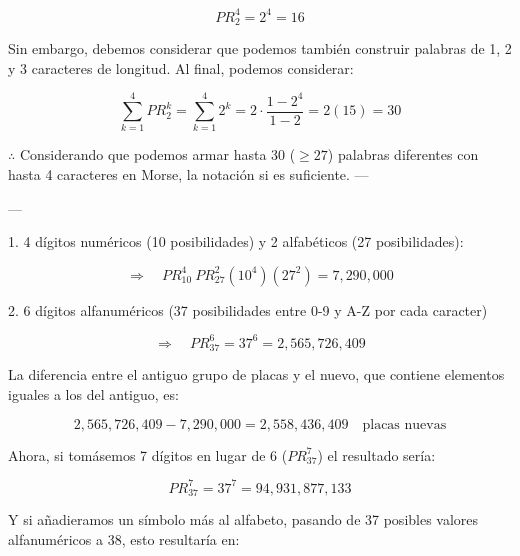 \documentclass{article}
\begin{document}
$$PR^{4}_{2} = 2^4 = 16$$

\bigskip

Sin embargo, debemos considerar que podemos también construir palabras de 1, 2 y 3 caracteres de longitud. Al final, podemos considerar:

$$\sum\limits^{4}_{k=1} PR^{k}_{2} = \sum\limits^{4}_{k=1} 2^k = 2 \cdot \dfrac{1 - 2^4}{1 - 2} = 2 (15) = 30$$

\bigskip

$\therefore$ Considerando que podemos armar hasta 30 ($\geq 27$) palabras diferentes con hasta 4 caracteres en Morse, la notación si es suficiente.
---

\newpage


---

\bigskip


1. 4 dígitos numéricos (10 posibilidades) y 2 alfabéticos (27 posibilidades):

$$\Rightarrow \quad PR^{4}_{10} \medspace PR^{2}_{27} (10^4)(27^2) = 7,290,000$$

2. 6 dígitos alfanuméricos (37 posibilidades entre 0-9 y A-Z por cada caracter)

$$\Rightarrow \quad PR^{6}_{37} = 37^6 = 2,565,726,409$$

La diferencia entre el antiguo grupo de placas y el nuevo, que contiene elementos iguales a los del antiguo, es:

$$2,565,726,409 - 7,290,000 = 2,558,436,409 \quad \text{placas nuevas}$$

Ahora, si tomásemos 7 dígitos en lugar de 6 ($PR^{7}_{37}$) el resultado sería:

$$PR^{7}_{37} = 37^7 = 94,931,877,133$$

Y si añadieramos un símbolo más al alfabeto, pasando de 37 posibles valores alfanuméricos a 38, esto resultaría en:
\end{document}
